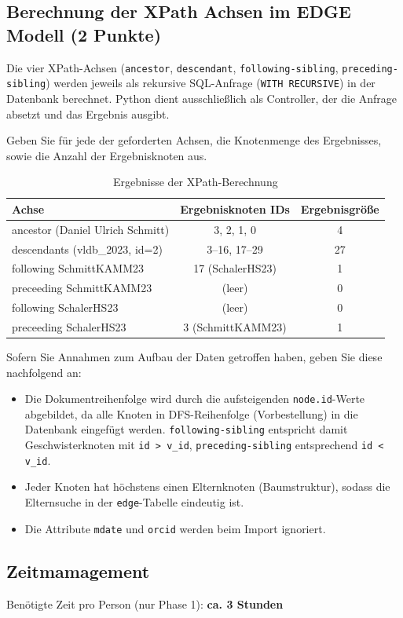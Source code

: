 \documentclass[11pt]{scrartcl}
\begin{document}
\subsection*{Berechnung der XPath Achsen im EDGE Modell (2 Punkte)}

Die vier XPath-Achsen (\texttt{ancestor}, \texttt{descendant}, \texttt{following-sibling},
\texttt{preceding-sibling}) werden jeweils als rekursive SQL-Anfrage (\texttt{WITH RECURSIVE})
in der Datenbank berechnet. Python dient ausschließlich als Controller, der die Anfrage absetzt
und das Ergebnis ausgibt.

Geben Sie für jede der geforderten Achsen, die Knotenmenge des Ergebnisses, sowie die Anzahl der Ergebnisknoten aus.

\begin{table}[h]
  \centering
    \begin{center}
      \begin{tabular}{ l | c c }
        \toprule
        Achse & Ergebnisknoten IDs & Ergebnisgröße\\
        \midrule
        ancestor (Daniel Ulrich Schmitt)    & 3, 2, 1, 0              & 4  \\
        descendants (vldb\_2023, id=2)      & 3--16, 17--29           & 27 \\
        following SchmittKAMM23             & 17 (SchalerHS23)        & 1  \\
        preceeding SchmittKAMM23            & (leer)                  & 0  \\
        following SchalerHS23               & (leer)                  & 0  \\
        preceeding SchalerHS23              & 3 (SchmittKAMM23)       & 1  \\
        \bottomrule
      \end{tabular}
    \end{center}
  \caption{Ergebnisse der XPath-Berechnung}
  \label{tab:ErgebnisseDerXPathBerechnug}
\end{table}

Sofern Sie Annahmen zum Aufbau der Daten getroffen haben, geben Sie diese nachfolgend an:
\begin{itemize}
  \item Die Dokumentreihenfolge wird durch die aufsteigenden \texttt{node.id}-Werte abgebildet,
        da alle Knoten in DFS-Reihenfolge (Vorbestellung) in die Datenbank eingefügt werden.
        \texttt{following-sibling} entspricht damit Geschwisterknoten mit \texttt{id > v\_id},
        \texttt{preceding-sibling} entsprechend \texttt{id < v\_id}.
  \item Jeder Knoten hat höchstens einen Elternknoten (Baumstruktur), sodass die Elternsuche
        in der \texttt{edge}-Tabelle eindeutig ist.
  \item Die Attribute \texttt{mdate} und \texttt{orcid} werden beim Import ignoriert.
\end{itemize}

\subsection*{Zeitmamagement}

Benötigte Zeit pro Person (nur Phase 1): \textbf{ca. 3 Stunden}
\end{document}
